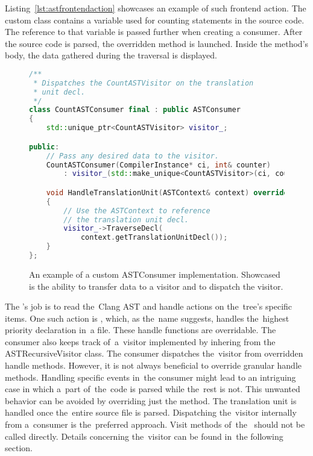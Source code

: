 Listing~\ref{lst:astfrontendaction} showcases an example of such frontend 
action. 
The custom class contains a variable used for counting statements 
in the source code. 
The reference to that variable is passed further when creating a consumer. 
After the source code is parsed, the overridden  
method is launched. 
Inside the method's body, the data gathered during the traversal is 
displayed.

\begin{figure}[H]\centering
\begin{lstlisting}[language=C++]
/**
 * Dispatches the CountASTVisitor on the translation 
 * unit decl.
 */
class CountASTConsumer final : public ASTConsumer
{
	std::unique_ptr<CountASTVisitor> visitor_;

public:
	// Pass any desired data to the visitor.
	CountASTConsumer(CompilerInstance* ci, int& counter)
		: visitor_(std::make_unique<CountASTVisitor>(ci, counter)) { }

	void HandleTranslationUnit(ASTContext& context) override
	{
		// Use the ASTContext to reference 
		// the translation unit decl.
		visitor_->TraverseDecl(
			context.getTranslationUnitDecl());
	}
};
\end{lstlisting}
\caption{An example of a custom ASTConsumer implementation.
Showcased is the ability to transfer data to a visitor and
to dispatch the visitor.}
\label{lst:astconsumer}
\end{figure}

The 's job is to read the~Clang AST and handle actions
on the~tree's specific items. 
One such action is , which, as the~name suggests,
handles the~highest priority declaration in~a file. 
These handle functions are overridable. 
The consumer also keeps track of~a~visitor implemented by inhering from 
the ASTRecursiveVisitor class. 
The consumer dispatches the~visitor from overridden handle methods. 
However, it is not always beneficial to override granular handle methods. 
Handling specific events in~the consumer might lead to an intriguing case 
in which a~part of~the~code is parsed while the~rest is not. 
This unwanted behavior can be avoided by overriding just 
the  method. 
The translation unit is handled once the~entire source file is parsed. 
Dispatching the~visitor internally from a~consumer is the~preferred 
approach. 
Visit methods of~the~ should not be called 
directly. 
Details concerning the~visitor can be found in~the following section.

